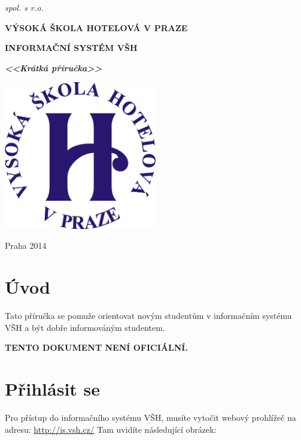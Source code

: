\documentclass[a4paper,12pt]{article}
\begin{document}

\thispagestyle{empty}
\begin{center}
	\textit{spol. s r.o.}
	\vspace{0.5ex}
	
	\textbf{VÝSOKÁ ŠKOLA HOTELOVÁ V PRAZE}
\end{center}
\vspace{13ex}

\begin{center}
	\vspace{13ex}
	\textbf{INFORMAČNÍ SYSTÉM VŠH}
	\vspace{1ex}
	
	\textbf{\textit{<<Krátká příručka>>}}
	
	\vfill
	\includegraphics[width=0.5\textwidth]{logo}
	
	\vfill
	Praha 2014
\end{center}

\newpage

\section{Úvod}

Tato příručka se pomuže orientovat novým studentům v informačním systému VŠH 
a být dobře informováným studentem.

\vspace{15ex}
\textbf{TENTO DOKUMENT NENÍ OFICIÁLNÍ.}

\newpage

\section{Přihlásit se}

Pro přístup do informačního systému VŠH, musíte vytočit 
webový prohlížeč na adresu: \url{http://is.vsh.cz/}
Tam uvidíte následující obrázek:
\end{document}
